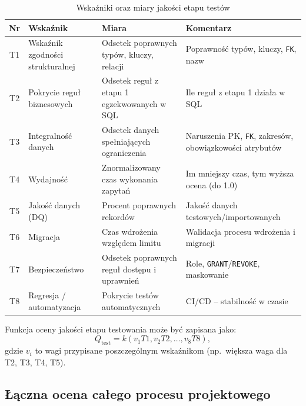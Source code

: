 \begin{table}[ht]
  \centering
  \caption{Wskaźniki oraz miary jakości etapu testów}
  \label{tab:testy-metryki}
  \scriptsize
  \begin{tabularx}{\textwidth}{cLp{4.5cm}L}
    \toprule
    \textbf{Nr} & \textbf{Wskaźnik} & \textbf{Miara} & \textbf{Komentarz} \\
    \midrule
    T1 &
    Wskaźnik zgodności strukturalnej &
    Odsetek poprawnych typów, kluczy, relacji &
    Poprawność typów, kluczy, \texttt{FK}, nazw \\
    T2 &
    Pokrycie reguł biznesowych &
    Odsetek reguł z etapu 1 egzekwowanych w SQL &
    Ile reguł z etapu 1 działa w SQL \\
    T3 &
    Integralność danych &
    Odsetek danych spełniających ograniczenia &
    Naruszenia PK, \texttt{FK}, zakresów, obowiązkowości atrybutów \\
    T4 &
    Wydajność &
    Znormalizowany czas wykonania zapytań &
    Im mniejszy czas, tym wyższa ocena (do 1.0) \\
    T5 &
    Jakość danych (DQ) &
    Procent poprawnych rekordów &
    Jakość danych testowych/importowanych \\
    T6 &
    Migracja &
    Czas wdrożenia względem limitu &
    Walidacja procesu wdrożenia i migracji \\
    T7 &
    Bezpieczeństwo &
    Odsetek poprawnych reguł dostępu i uprawnień &
    Role, \texttt{GRANT}/\texttt{REVOKE}, maskowanie \\
    T8 &
    Regresja / automatyzacja &
    Pokrycie testów automatycznych &
    CI/CD -- stabilność w czasie \\
    \bottomrule
  \end{tabularx}
\end{table}


Funkcja oceny jakości etapu testowania może być zapisana jako:
\begin{equation}
  Q_{\mathrm{test}} = k(v_1 T1, v_2 T2, \dots, v_8 T8),
\end{equation}
gdzie $v_i$ to wagi przypisane poszczególnym wskaźnikom (np.\ większa waga dla T2, T3, T4, T5).

\subsection*{Łączna ocena całego procesu projektowego}


